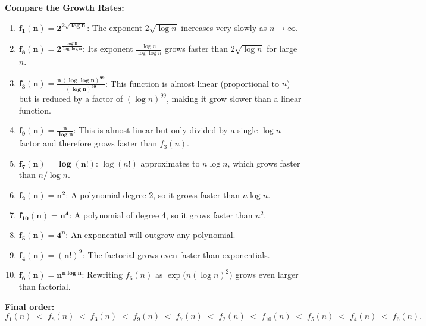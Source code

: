 \documentclass[12pt]{article}
\begin{document}
\bigskip
\noindent \textbf{Compare the Growth Rates:}

\begin{enumerate}
    \item \(\boldsymbol{f_1(n)=2^{2\sqrt{\log n}}}\):  
    The exponent \(2\sqrt{\log n}\) increases very slowly as \(n\to\infty\).

    \item \(\boldsymbol{f_8(n)=2^{\frac{\log n}{\log \log n}}}\):  
    Its exponent \(\frac{\log n}{\log \log n}\) grows faster than \(2\sqrt{\log n}\) for large \(n\).

    \item \(\boldsymbol{f_3(n)=\frac{n\,(\log \log n)^{99}}{(\log n)^{99}}}\):  
    This function is almost linear (proportional to \(n\)) but is reduced by a factor of \((\log n)^{99}\), making it grow slower than a linear function.

    \item \(\boldsymbol{f_9(n)=\frac{n}{\log n}}\):  
    This is almost linear but only divided by a single \(\log n\) factor and therefore grows faster than \(f_3(n)\).

    \item \(\boldsymbol{f_7(n)=\log(n!)}\):  
    \(\log(n!)\) approximates to \(n\log n\), which grows faster than \(n/\log n\).

    \item \(\boldsymbol{f_2(n)=n^2}\):  
    A polynomial degree 2, so it grows faster than \(n\log n\).

    \item \(\boldsymbol{f_{10}(n)=n^4}\):  
    A polynomial of degree 4, so it grows faster than \(n^2\).

    \item \(\boldsymbol{f_5(n)=4^n}\):  
    An exponential will outgrow any polynomial.

    \item \(\boldsymbol{f_4(n)=(n!)^2}\):  
    The factorial grows even faster than exponentials.

    \item \(\boldsymbol{f_6(n)=n^{n \log n}}\):  
    Rewriting \(f_6(n)\) as \(\exp\bigl(n(\log n)^2\bigr)\) grows even larger than factorial.

\end{enumerate}

\noindent \textbf{Final order:}\\[0.5em]

\[
\boxed{
f_1(n) \;<\; f_8(n) \;<\; f_3(n) \;<\; f_9(n) \;<\; f_7(n) \;<\; f_2(n) \;<\; f_{10}(n) \;<\; f_5(n) \;<\; f_4(n) \;<\; f_6(n).
}
\]
\end{document}
